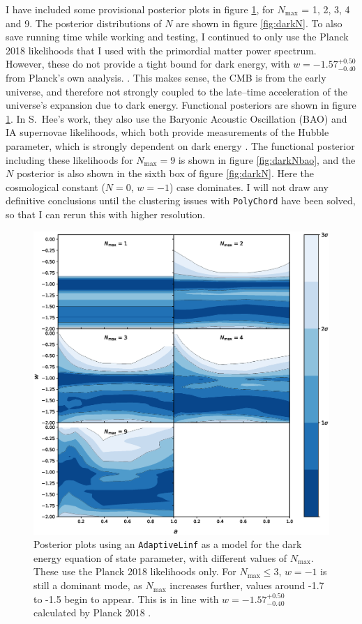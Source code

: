 \documentclass{article}
\begin{document}
I have included some provisional posterior plots in figure \ref{fig:externalwa}, for $N_\textrm{max}$ = 1, 2, 3, 4 and 9. The posterior distributions of $N$ are shown in figure \ref{fig:darkN}. To also save running time while working and testing, I continued to only use the Planck 2018 likelihoods that I used with the primordial matter power spectrum. However, these do not provide a tight bound for dark energy, with $w=-1.57_{-0.40}^{+0.50}$ from Planck's own analysis. \cite{planck_6}. This makes sense, the CMB is from the early universe, and therefore not strongly coupled to the late--time acceleration of the universe's expansion due to dark energy. Functional posteriors are shown in figure \ref{fig:externalwa}. In S.~Hee's work, they also use the Baryonic Acoustic Oscillation (BAO) and IA supernovae likelihoods, which both provide measurements of the Hubble parameter, which is strongly dependent on dark energy \cite{Sonke, BAO1, BAO2, BAO3, SNIa}. The functional posterior including these likelihoods for $N_\textrm{max}=9$ is shown in figure \ref{fig:darkNbao}, and the $N$ posterior is also shown in the sixth box of figure \ref{fig:darkN}. Here the cosmological constant ($N=0$, $w=-1$) case dominates. I will not draw any definitive conclusions until the clustering issues with \texttt{PolyChord} have been solved, so that I can rerun this with higher resolution.

\newpage

\begin{figure}[H]
  \centering
  \includegraphics[width=16cm]{adaptivew.eps}
  \caption{Posterior plots using an \texttt{AdaptiveLinf} as a model for the dark energy equation of state parameter, with different values of $N_\textrm{max}$. These use the Planck 2018 likelihoods only. For $N_\textrm{max}\le 3$, $w=-1$ is still a dominant mode, as $N_\textrm{max}$ increases further, values around -1.7 to -1.5 begin to appear. This is in line with $w=-1.57_{-0.40}^{+0.50}$ calculated by Planck 2018 \cite{planck_6}.}
  \label{fig:externalwa}
\end{figure}
\end{document}
